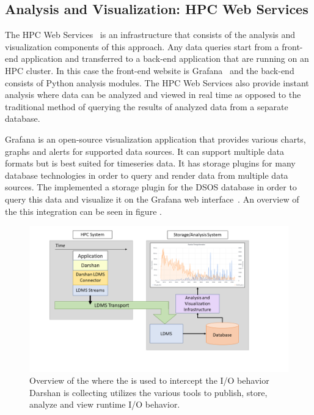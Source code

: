 \subsection{Analysis and Visualization: HPC Web Services}
The HPC Web Services~\cite{ClusterAV} is an infrastructure that consists of the analysis and visualization components of this approach. Any data queries start from a front-end application and transferred to a back-end application that are running on an HPC cluster. In this case the front-end website is Grafana~\cite{grafana-website} and the back-end consists of Python analysis modules. The HPC Web Services also provide instant analysis where data can be analyzed and viewed in real time as opposed to the traditional method of querying the results of analyzed data from a separate database.

Grafana is an open-source visualization application that provides various charts, graphs and alerts for supported data sources. It can support multiple data formats but is best suited for timeseries data. It has storage plugins for many database technologies in order to query and render data from multiple data sources. The \Darshan implemented a storage plugin for the DSOS database in order to query this data and visualize it on the Grafana web interface~\cite{grafana-website}. An overview of the this integration can be seen in figure .

\begin{figure}
	\centering
	\includegraphics[trim=3cm 2cm 0cm 0cm, clip,width=1.2\linewidth]{figs/darshan-integration.png}
	\caption{Overview of the \Darshan where the \connector is used to intercept the I/O behavior Darshan is collecting utilizes the various tools to publish, store, analyze and view runtime I/O behavior.}
	\label{f:CSV Header and Output}
\end{figure}

